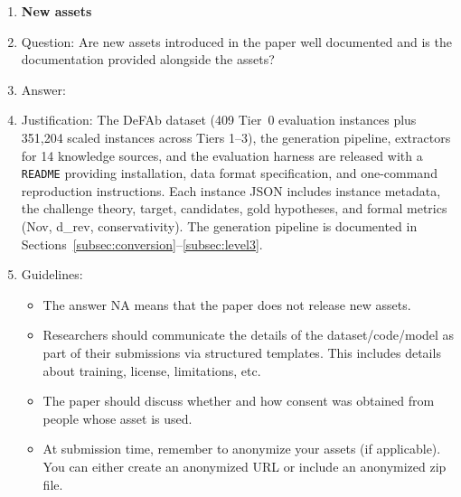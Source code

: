 \documentclass{article}
\theoremstyle{definition}
\begin{document}
\begin{enumerate}
\item {\bf New assets}
    \item[] Question: Are new assets introduced in the paper well documented and is the documentation provided alongside the assets?
    \item[] Answer: \answerYes{}
    \item[] Justification: The DeFAb dataset (409 Tier~0 evaluation instances plus 351,204 scaled instances across Tiers 1--3), the generation pipeline, extractors for 14 knowledge sources, and the evaluation harness are released with a \texttt{README} providing installation, data format specification, and one-command reproduction instructions. Each instance JSON includes instance metadata, the challenge theory, target, candidates, gold hypotheses, and formal metrics (Nov, d\_rev, conservativity). The generation pipeline is documented in Sections~\ref{subsec:conversion}--\ref{subsec:level3}.
    \item[] Guidelines:
    \begin{itemize}
        \item The answer NA means that the paper does not release new assets.
        \item Researchers should communicate the details of the dataset/code/model as part of their submissions via structured templates. This includes details about training, license, limitations, etc. 
        \item The paper should discuss whether and how consent was obtained from people whose asset is used.
        \item At submission time, remember to anonymize your assets (if applicable). You can either create an anonymized URL or include an anonymized zip file.
    \end{itemize}


\end{enumerate}
\end{document}
